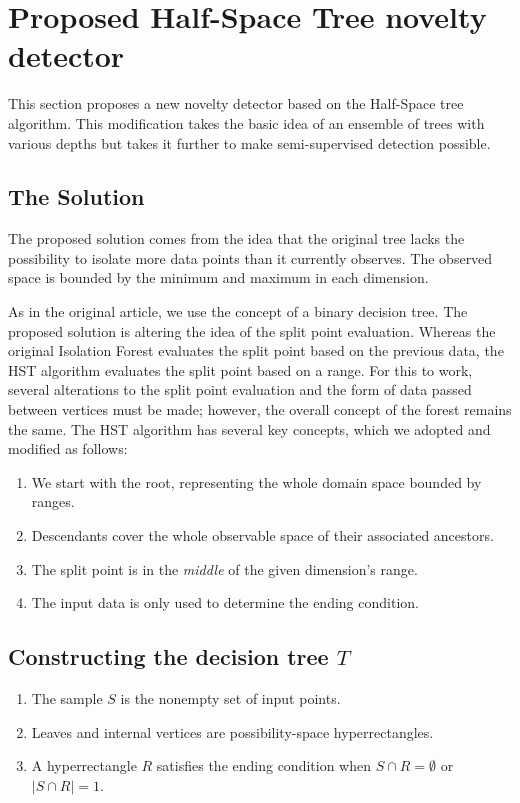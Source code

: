 \section{Proposed Half-Space Tree novelty detector}
\label{sec:novelty_isolation_forest}
This section proposes a new novelty detector based on the Half-Space tree algorithm.
This modification takes the basic idea of an ensemble of trees with various depths but takes it further to make semi-supervised detection possible.

\subsection{The Solution}
The proposed solution comes from the idea that the original tree lacks the possibility to isolate more data points than it currently observes.
The observed space is bounded by the minimum and maximum in each dimension.

As in the original article, we use the concept of a binary decision tree. The proposed solution is altering the idea of the split point evaluation. Whereas the original Isolation Forest evaluates the split point based on the previous data, the HST algorithm evaluates the split point based on a range. For this to work, several alterations to the split point evaluation and the form of data passed between vertices must be made; however, the overall concept of the forest remains the same.
The HST algorithm has several key concepts, which we adopted and modified as follows:

\begin{enumerate}
    \item We start with the root, representing the whole domain space bounded by ranges.
    \item Descendants cover the whole observable space of their associated ancestors. 
    \item The split point is in the \emph{middle} of the given dimension’s range.
    \item The input data is only used to determine the ending condition.
\end{enumerate}

\subsection{Constructing the decision tree $T$}

\begin{enumerate}
    \item The sample \(S\) is the nonempty set of input points.
    \item Leaves and internal vertices are possibility-space hyperrectangles. 
    \item A hyperrectangle $R$ satisfies the ending condition when \(S \cap R = \emptyset\) or \(| S \cap R | = 1\).
\end{enumerate}




